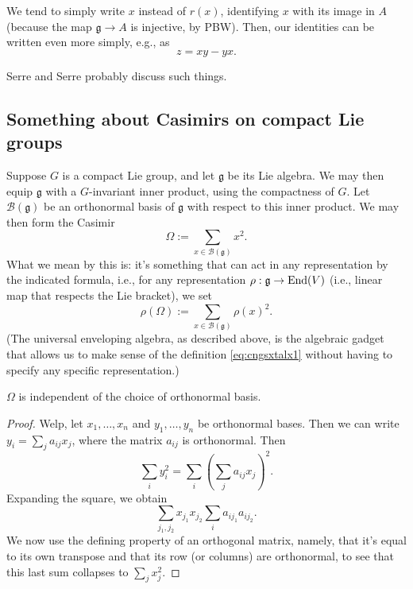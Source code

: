 \documentclass[reqno]{amsart} 
\begin{document}
We tend to simply write $x$ instead of $r(x)$, identifying $x$ with its image in $A$ (because the map $\mathfrak{g} \rightarrow A$ is injective, by PBW).  Then, our identities can be written even more simply, e.g., as
\begin{equation*}
  z = x y - y x.
\end{equation*}


Serre \cite{MR1808366} and Serre \cite{MR2179691} probably discuss such things.

\subsection{Something about Casimirs on compact Lie groups}\label{sec:cngsxurggj}
Suppose $G$ is a compact Lie group, and let $\mathfrak{g}$ be its Lie algebra.  We may then equip $\mathfrak{g}$ with a $G$-invariant inner product, using the compactness of $G$.  Let $\mathcal{B}(\mathfrak{g})$ be an orthonormal basis of $\mathfrak{g}$ with respect to this inner product.  We may then form the Casimir
\begin{equation}\label{eq:cngsxtalx1}
  \Omega := \sum_{x \in \mathcal{B}(\mathfrak{g})} x^2.
\end{equation}
What we mean by this is: it's something that can act in any representation by the indicated formula, i.e., for any representation $\rho : \mathfrak{g} \rightarrow \operatorname{End}(V)$ (i.e., linear map that respects the Lie bracket), we set
\begin{equation*}
  \rho(\Omega) := \sum_{x \in \mathcal{B}(\mathfrak{g})} \rho(x)^2.
\end{equation*}
(The universal enveloping algebra, as described above, is the algebraic gadget that allows us to make sense of the definition \eqref{eq:cngsxtalx1} without having to specify any specific representation.)

\begin{fact}\label{fact:cngsxurkz3}
  $\Omega$ is independent of the choice of orthonormal basis.
\end{fact}
\begin{proof}
  Welp, let $x_1, \dotsc, x_n$ and $y_1, \dotsc, y_n$ be orthonormal bases.  Then we can write $y_i = \sum_j a_{i j} x_j$, where the matrix $a_{i j}$ is orthonormal.  Then
  \begin{equation*}
    \sum_{i} y_i^2 = \sum_i \left( \sum_j a_{i j} x_j \right)^2.
  \end{equation*}
  Expanding the square, we obtain
  \begin{equation*}
    \sum_{j_1, j_2} x_{j_1} x_{j_2} \sum_i a_{i j_1} a_{i j_2}.
  \end{equation*}
  We now use the defining property of an orthogonal matrix, namely, that it's equal to its own transpose and that its row (or columns) are orthonormal, to see that this last sum collapses to $\sum_j x_j^2$.
\end{proof}
\end{document}
